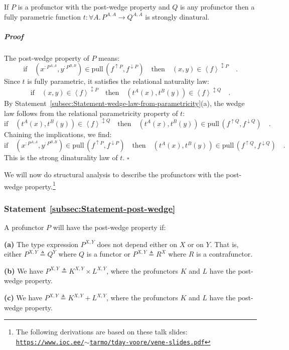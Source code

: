 If $P$ is a profunctor with the post-wedge property and $Q$ is any
profunctor then a fully parametric function $t:\forall A.\,P^{A,A}\rightarrow Q^{A,A}$
is strongly dinatural.

\subparagraph{Proof}

The post-wedge property of $P$ means:
\[
\text{if}\quad(x^{:P^{A,A}},y^{:P^{B,B}})\in\text{pull}\,(f^{\uparrow P},f^{\downarrow P})\quad\text{then}\quad(x,y)\in\left<f\right>^{\updownarrow P}\quad.
\]
Since $t$ is fully parametric, it satisfies the relational naturality
law:
\[
\text{if}\quad(x,y)\in\left<f\right>^{\updownarrow P}\quad\text{then}\quad(t^{A}(x),t^{B}(y))\in\left<f\right>^{\updownarrow Q}\quad.
\]
By Statement~\ref{subsec:Statement-wedge-law-from-parametricity}(a),
the wedge law follows from the relational parametricity property of
$t$:
\[
\text{if}\quad(t^{A}(x),t^{B}(y))\in\left<f\right>^{\updownarrow Q}\quad\text{then}\quad(t^{A}(x),t^{B}(y))\in\text{pull}\,(f^{\uparrow Q},f^{\downarrow Q})\quad.
\]
Chaining the implications, we find:
\[
\text{if}\quad(x^{:P^{A,A}},y^{:P^{B,B}})\in\text{pull}\,(f^{\uparrow P},f^{\downarrow P})\quad\text{then}\quad(t^{A}(x),t^{B}(y))\in\text{pull}\,(f^{\uparrow Q},f^{\downarrow Q})\quad.
\]
This is the strong dinaturality law of $t$. $\square$

We will now do structural analysis to describe the profunctors with
the post-wedge property.\footnote{The following derivations are based on these talk slides: \texttt{\href{https://www.ioc.ee/~tarmo/tday-voore/vene-slides.pdf}{https://www.ioc.ee/$\sim$tarmo/tday-voore/vene-slides.pdf}}} 

\subsubsection{Statement \label{subsec:Statement-post-wedge}\ref{subsec:Statement-post-wedge}}

A profunctor $P$ will have the post-wedge property if:

\textbf{(a)} The type expression $P^{X,Y}$ does not depend either
on $X$ or on $Y$. That is, either $P^{X,Y}\triangleq Q^{Y}$ where
$Q$ is a functor or $P^{X,Y}\triangleq R^{X}$ where $R$ is a contrafunctor. 

\textbf{(b)} We have $P^{X,Y}\triangleq K^{X,Y}\times L^{X,Y}$, where
the profunctors $K$ and $L$ have the post-wedge property.

\textbf{(c)} We have $P^{X,Y}\triangleq K^{X,Y}+L^{X,Y}$, where the
profunctors $K$ and $L$ have the post-wedge property.

